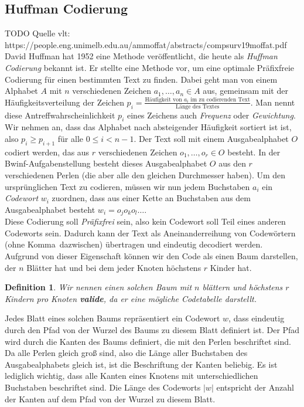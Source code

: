 \documentclass[a4paper,10pt,ngerman]{scrartcl}
\newtheorem{definition}[satz]{Definition}
\begin{document}
    \subsection{Huffman Codierung}
    TODO Quelle vlt: https://people.eng.unimelb.edu.au/ammoffat/abstracts/compsurv19moffat.pdf\\
    David Huffman hat 1952 eine Methode veröffentlicht, die heute als \textit{Huffman Codierung} bekannt ist.
    Er stellte eine Methode vor, um eine optimale Präfixfreie Codierung für einen bestimmten Text zu finden.
    Dabei geht man von einem Alphabet $A$ mit $n$ verschiedenen Zeichen $a_1, \dots, a_n \in A$ aus, gemeinsam mit der Häufigkeitsverteilung der Zeichen $p_i = \frac {\text{Häufigkeit von $a_i$ im zu codierenden Text}} {\text{Länge des Textes}}$. Man nennt diese Antreffwahrscheinlichkeit $p_i$ eines Zeichens auch \textit{Frequenz} oder \textit{Gewichtung}.
    Wir nehmen an, dass das Alphabet nach absteigender Häufigkeit sortiert ist ist, also $p_i \ge p_{i + 1}$ für alle $0 \le i < n - 1$.
    Der Text soll mit einem Ausgabealphabet $O$ codiert werden, das aus $r$ verschiedenen Zeichen $o_1, \dots, o_r \in O$ besteht. In der Bwinf-Aufgabenstellung besteht dieses Ausgabealphabet $O$ aus den $r$ verschiedenen Perlen (die aber alle den gleichen Durchmesser haben). Um den ursprünglichen Text zu codieren, müssen wir nun jedem Buchstaben $a_i$ ein \textit{Codewort} $w_i$ zuordnen, dass aus einer Kette an Buchstaben aus dem Ausgabealphabet besteht $w_i = o_j o_k o_l \dots$. \\
    Diese Codierung soll \textit{Präfixfrei} sein, also kein Codewort soll Teil eines anderen Codeworts sein.
    Dadurch kann der Text als Aneinanderreihung von Codewörtern (ohne \glqq Komma\grqq~dazwischen) übertragen und eindeutig decodiert werden. \\
    Aufgrund von dieser Eigenschaft können wir den Code als einen Baum darstellen, der $n$ Blätter hat und bei dem jeder Knoten höchstens $r$ Kinder hat.
    \begin{definition}
        Wir nennen einen solchen Baum mit $n$ blättern und höchstens $r$ Kindern pro Knoten \textbf{valide}, da er eine mögliche Codetabelle darstellt.
    \end{definition}
    Jedes Blatt eines solchen Baums repräsentiert ein Codewort $w$, dass eindeutig durch den Pfad von der Wurzel des Baums zu diesem Blatt definiert ist. Der Pfad wird durch die Kanten des Baums definiert, die mit den Perlen beschriftet sind. Da alle Perlen gleich groß sind, also die Länge aller Buchstaben des Ausgabealphabets gleich ist, ist die Beschriftung der Kanten beliebig. Es ist lediglich wichtig, dass alle Kanten eines Knotens mit unterschiedlichen Buchstaben beschriftet sind. Die Länge des Codeworts $|w|$ entspricht der Anzahl der Kanten auf dem Pfad von der Wurzel zu diesem Blatt. \\
\end{document}
